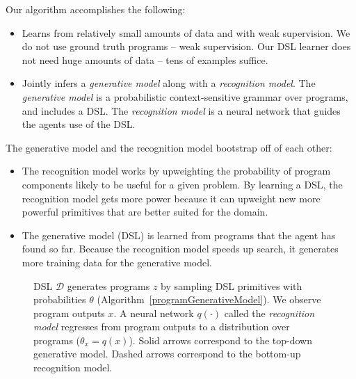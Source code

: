 \documentclass{article}
\begin{document}
Our algorithm accomplishes the following:
\begin{itemize}
\item Learns from relatively small amounts of data and with weak supervision. We do not use ground truth programs -- weak supervision. Our DSL learner does not need huge amounts of data -- tens of examples suffice.
  \item Jointly infers a \emph{generative model} along with a \emph{recognition model}. The \emph{generative model} is a probabilistic context-sensitive grammar over programs, and includes a DSL. The \emph{recognition model} is a neural network that guides the agents use of the DSL.
\end{itemize}
The generative model and the recognition model bootstrap off of each other:
\begin{itemize}
\item The recognition model works by upweighting the probability of program components likely to be useful for a given problem. By learning a DSL, the recognition model gets more power because it can upweight new more powerful primitives that are better suited for the domain.
\item The generative model (DSL) is learned from programs that the agent has found so far. Because the recognition model speeds up search, it generates more training data for the generative model.
\end{itemize}

\begin{figure}
  \caption{DSL $\mathcal{D}$ generates programs $z$ by sampling DSL primitives with probabilities $\theta$ (Algorithm~\ref{programGenerativeModel}). We observe program outputs $x$. A neural network $q(\cdot )$ called the \emph{recognition model} regresses from program outputs to a distribution over programs ($\theta_x = q(x)$). Solid arrows correspond to the top-down generative model. Dashed arrows correspond to the bottom-up recognition model.}
\end{figure}
\end{document}
